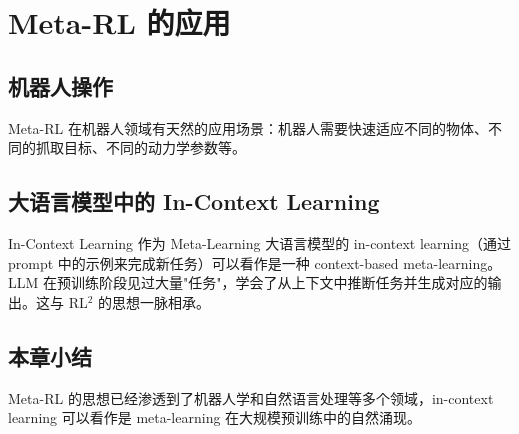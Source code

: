 \section{Meta-RL 的应用}

\subsection{机器人操作}

Meta-RL 在机器人领域有天然的应用场景：机器人需要快速适应不同的物体、不同的抓取目标、不同的动力学参数等。

\subsection{大语言模型中的 In-Context Learning}

\begin{knowledgebox}{In-Context Learning 作为 Meta-Learning}
大语言模型的 in-context learning（通过 prompt 中的示例来完成新任务）可以看作是一种 context-based meta-learning。LLM 在预训练阶段见过大量"任务"，学会了从上下文中推断任务并生成对应的输出。这与 RL$^2$ 的思想一脉相承。
\end{knowledgebox}

\subsection{本章小结}

Meta-RL 的思想已经渗透到了机器人学和自然语言处理等多个领域，in-context learning 可以看作是 meta-learning 在大规模预训练中的自然涌现。

